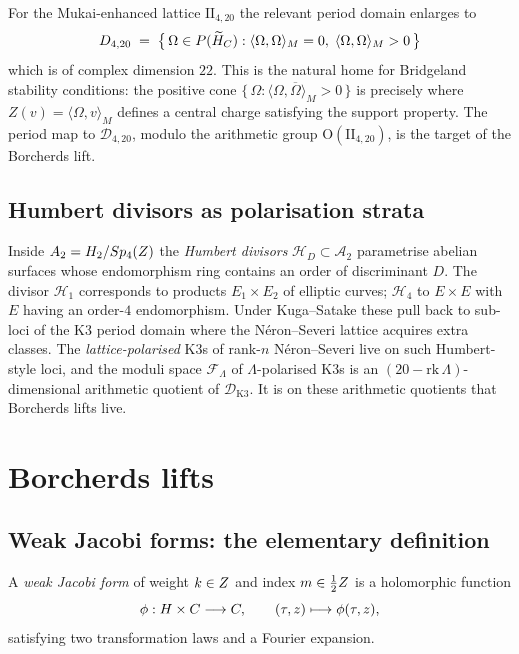 For the Mukai-enhanced lattice $\mathrm{II}_{4, 20}$ the relevant period domain enlarges to
\[
  D_{4, 20} \;=\; \bigl\{\, \Omega \in P(\widetilde H_{C}) : \langle \Omega, \Omega\rangle_M = 0, \; \langle \Omega, \Omega\rangle_M > 0 \,\bigr\}
\]
which is of complex dimension $22$. This is the natural home for Bridgeland stability conditions: the positive cone $\{\,\Omega : \langle \Omega, \overline\Omega\rangle_M > 0\,\}$ is precisely where $Z(v) = \langle \Omega, v\rangle_M$ defines a central charge satisfying the support property. The period map to $\mathcal D_{4, 20}$, modulo the arithmetic group $\mathrm{O}(\mathrm{II}_{4, 20})$, is the target of the Borcherds lift.

\subsection{Humbert divisors as polarisation strata}

Inside $A_2 = H_2 / Sp_4(Z)$ the \emph{Humbert divisors} $\mathcal H_D \subset \mathcal A_2$ parametrise abelian surfaces whose endomorphism ring contains an order of discriminant $D$. The divisor $\mathcal H_1$ corresponds to products $E_1 \times E_2$ of elliptic curves; $\mathcal H_4$ to $E \times E$ with $E$ having an order-$4$ endomorphism. Under Kuga--Satake these pull back to sub-loci of the K3 period domain where the N\'eron--Severi lattice acquires extra classes. The \emph{lattice-polarised} K3s of rank-$n$ N\'eron--Severi live on such Humbert-style loci, and the moduli space $\mathcal F_\Lambda$ of $\Lambda$-polarised K3s is an $(20 - \mathrm{rk}\, \Lambda)$-dimensional arithmetic quotient of $\mathcal D_{\mathrm{K3}}$. It is on these arithmetic quotients that Borcherds lifts live.

\section{Borcherds lifts}
\label{gluech:7.2}

\subsection{Weak Jacobi forms: the elementary definition}

A \emph{weak Jacobi form} of weight $k \in Z$ and index $m \in \tfrac12 Z$ is a holomorphic function
\[
  \phi: H \times C \longrightarrow C,
  \qquad (\tau, z) \longmapsto \phi(\tau, z),
\]
satisfying two transformation laws and a Fourier expansion.

